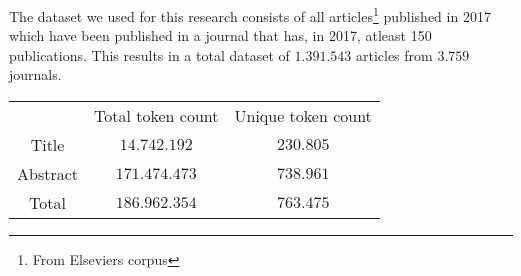 \documentclass[../../Thesis.tex]{subfiles}
\begin{document}
The dataset we used for this research consists of all articles\footnote{From Elseviers corpus} published in 2017 which have been published in a journal that has, in 2017, atleast 150 publications. This results in a total dataset of $1.391.543$ articles from $3.759$ journals.

\begin{tabular}{c c c}
 & Total token count & Unique token count \\
Title & $14.742.192$ & $230.805$ \\
Abstract & $171.474.473$ & $738.961$ \\
Total & $186.962.354$ & $763.475$ \\
\end{tabular}
\end{document}
